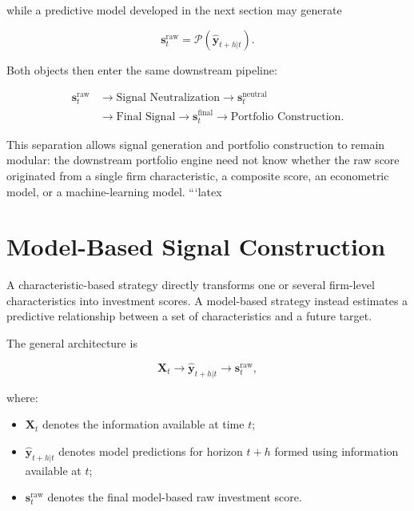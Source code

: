 \documentclass[11pt,a4paper]{article}
\begin{document}
while a predictive model developed in the next section may generate

\begin{equation}
\mathbf{s}_t^{\mathrm{raw}}
=
\mathcal{P}
\left(
\widehat{\mathbf{y}}_{t+h|t}
\right).
\end{equation}

Both objects then enter the same downstream pipeline:

\begin{equation}
\boxed{
\begin{aligned}
\mathbf{s}_t^{\mathrm{raw}}
&\rightarrow
\text{Signal Neutralization}
\rightarrow
\mathbf{s}_t^{\mathrm{neutral}}
\\[0.1cm]
&\rightarrow
\text{Final Signal}
\rightarrow
\mathbf{s}_t^{\mathrm{final}}
\rightarrow
\text{Portfolio Construction}.
\end{aligned}
}
\end{equation}

This separation allows signal generation and portfolio construction to remain
modular: the downstream portfolio engine need not know whether the raw score
originated from a single firm characteristic, a composite score, an
econometric model, or a machine-learning model.
```latex
\section{Model-Based Signal Construction}
\label{sec:model_based_signal_construction}

A characteristic-based strategy directly transforms one or several firm-level
characteristics into investment scores. A model-based strategy instead estimates
a predictive relationship between a set of characteristics and a future target.

The general architecture is

\begin{equation}
\boxed{
\mathbf{X}_t
\rightarrow
\widehat{\mathbf{y}}_{t+h|t}
\rightarrow
\mathbf{s}_t^{\mathrm{raw}},
}
\end{equation}

where:

\begin{itemize}
    \item $\mathbf{X}_t$ denotes the information available at time $t$;
    \item $\widehat{\mathbf{y}}_{t+h|t}$ denotes model predictions for horizon
    $t+h$ formed using information available at $t$;
    \item $\mathbf{s}_t^{\mathrm{raw}}$ denotes the final model-based raw
    investment score.
\end{itemize}
\end{document}
